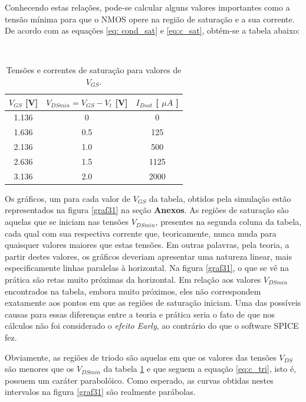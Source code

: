 \documentclass[12pt, a4paper]{article}
\begin{document}
\begin{enumerate}
       Conhecendo estas relações, pode-se calcular alguns valores importantes como a tensão mínima para que o NMOS opere na região de saturação e a sua corrente. De acordo com as equações \ref{eq: cond_sat} e \ref{eq:c_sat}, obtém-se a tabela abaixo:
       
            \begin{table} [h!]
            \caption{Tensões e correntes de saturação para valores de \(V_{GS}\). } \\
            \centering
            \label{table:tab_valores}
            
                \begin{tabular}{ c | c | c } 

                \(V_{GS}\) [V] & \(V_{DSmin} = V_{GS} - V_t\) [V] & \(I_{Dsat}\) [ \(\mu A\) ] \\
                \hline
                1.136 & 0 & 0 \\
                1.636 & 0.5 & 125 \\
                2.136 & 1.0 & 500 \\
                2.636 & 1.5 & 1125\\
                3.136 & 2.0 & 2000\\
                
                \end{tabular}
           \end{table}   
       
       Os gráficos, um para cada valor de \(V_{GS}\) da tabela, obtidos pela simulação estão representados na figura \ref{graf31} na seção \textbf{Anexos}. As regiões de saturação são aquelas que se iniciam nas tensões \(V_{DSmin}\), presentes na segunda coluna da tabela, cada qual com sua respectiva corrente que, teoricamente, nunca muda para quaisquer valores maiores que estas tensões. Em outras palavras, pela teoria, a partir destes valores, os gráficos deveriam apresentar uma natureza linear, mais especificamente linhas paralelas à horizontal. Na figura \ref{graf31}, o que se vê na prática são retas muito próximas da horizontal. Em relação aos valores \(V_{DSmin}\) encontrados na tabela, embora muito próximos, eles não correspondem exatamente aos pontos em que as regiões de saturação iniciam. Uma das possíveis causas para essas diferenças entre a teoria e prática seria o fato de que nos cálculos não foi considerado o \textit{efeito Early}, ao contrário do que o software SPICE fez.
       
       Obviamente, as regiões de triodo são aquelas em que os valores das tensões \(V_{DS}\) são menores que os \(V_{DSmin}\) da tabela \ref{table:tab_valores} e que seguem a equação \ref{eq:c_tri}, isto é, possuem um caráter parabolóico. Como esperado, as curvas obtidas nestes intervalos na figura \ref{graf31} são realmente parábolas.
       

\end{enumerate}
\end{document}
